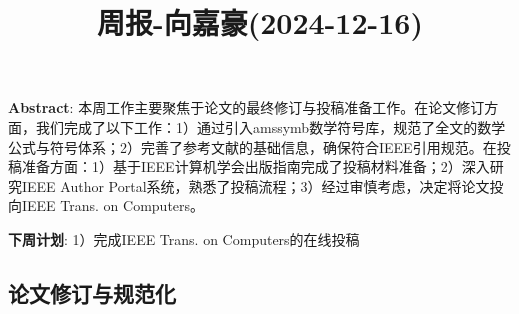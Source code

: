 \documentclass[11pt,a4paper]{article}
\title{周报-向嘉豪(2024-12-16)}
\renewcommand{\maketitle}{
  \begin{center}
    \LARGE\bfseries\thetitle
  \end{center}
}
\begin{document}
\maketitle


\noindent \textbf{Abstract}: 本周工作主要聚焦于论文的最终修订与投稿准备工作。在论文修订方面，我们完成了以下工作：1）通过引入amssymb数学符号库，规范了全文的数学公式与符号体系；2）完善了参考文献的基础信息，确保符合IEEE引用规范。在投稿准备方面：1）基于IEEE计算机学会出版指南完成了投稿材料准备；2）深入研究IEEE Author Portal系统，熟悉了投稿流程；3）经过审慎考虑，决定将论文投向IEEE Trans. on Computers。

\noindent \textbf{下周计划}: 1）完成IEEE Trans. on Computers的在线投稿


\subsection{论文修订与规范化}




% 
% 
\end{document}
